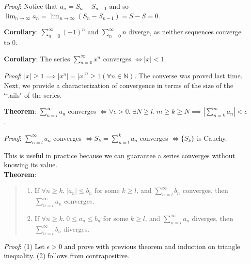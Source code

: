 \documentclass[11pt]{article}
\begin{document}
\emph{Proof}: Notice that $a_n = S_n - S_{n-1}$ and so $\lim_{n \to \infty} a_n = \lim_{n \to \infty} (S_n - S_{n-1}) = S - S = 0$.

\textbf{Corollary}: $\sum_{n=0}^\infty (-1)^n$ and $\sum_{n=0}^\infty n$ diverge, as neither sequences converge to 0.

\textbf{Corollary}: The series $\sum_{n=0}^\infty x^n$ converges $\iff |x| < 1$.

\emph{Proof}: $|x| \geq 1 \implies |x^n| = |x|^n \geq 1 (\forall n \in \mathbb{N})$. The converse was proved last time.\\

Next, we provide a characterization of convergence in terms of the size of the ``tails" of the series.

\textbf{Theorem}: $\sum_{n=l}^\infty a_n$ converges $\iff \forall \epsilon > 0.\; \exists N \geq l.\; m \geq k \geq N \implies |\sum_{n=k}^m a_n| < \epsilon$.

\emph{Proof}: $\sum_{n=l}^\infty a_n$ converges $\iff S_k = \sum_{n=l}^k a_n$ converges $\iff \{S_k\}$ is Cauchy.

This is useful in practice because we can guarantee a series converges without knowing its value.\\

\textbf{Theorem}:
\begin{quote}\vspace{-0.3cm}
	\begin{enumerate}
	\item If $\forall n \geq k.\; |a_n| \leq b_n$ for some $k \geq l$, and $\sum\limits_{n=l}^\infty b_n$ converges, then $\sum\limits_{n=l}^\infty a_n$ converges.
	\item If $\forall n \geq k.\; 0 \leq a_n \leq b_n$ for some $k \geq l$, and $\sum\limits_{n=l}^\infty a_n$ diverges, then $\sum\limits_{n=l}^\infty b_n$ diverges.
	\end{enumerate}
\end{quote}

\emph{Proof}: (1) Let $\epsilon > 0$ and prove with previous theorem and induction on triangle inequality. (2) follows from contrapositive.
\end{document}
